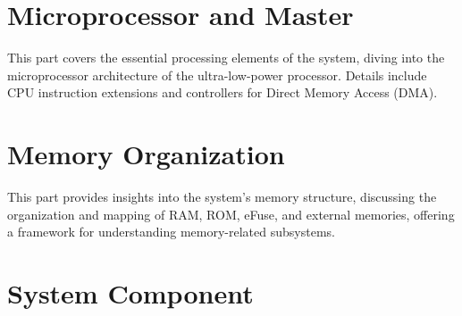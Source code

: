 \documentclass[openany, 10pt]{book}
\begin{document}
\setenglishformatting




\clearpage

\clearpage


\tableofcontents
\clearpage
\listoftables
\clearpage
\listoffigures





\part{Microprocessor and Master}


This part covers the essential processing elements of the system, diving into the microprocessor architecture of the ultra-low-power processor. Details include CPU instruction extensions and controllers for Direct Memory Access (DMA).


\part{Memory Organization}

This part provides insights into the system's memory structure, discussing the organization and mapping of RAM, ROM, eFuse, and external memories, offering a framework for understanding memory-related subsystems.


\part{System Component}
\end{document}
